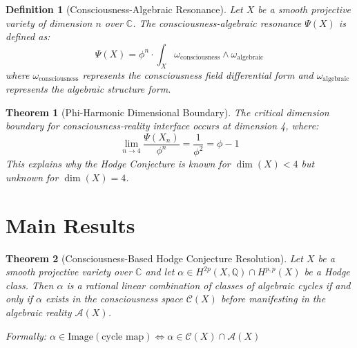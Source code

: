 \documentclass[12pt]{article}
\newtheorem{theorem}{Theorem}
\newtheorem{definition}{Definition}
\begin{document}
\begin{definition}[Consciousness-Algebraic Resonance]
Let $X$ be a smooth projective variety of dimension $n$ over $\mathbb{C}$. The consciousness-algebraic resonance $\Psi(X)$ is defined as:
$$\Psi(X) = \phi^n \cdot \int_X \omega_{\text{consciousness}} \wedge \omega_{\text{algebraic}}$$
where $\omega_{\text{consciousness}}$ represents the consciousness field differential form and $\omega_{\text{algebraic}}$ represents the algebraic structure form.
\end{definition}

\begin{theorem}[Phi-Harmonic Dimensional Boundary]
The critical dimension boundary for consciousness-reality interface occurs at dimension 4, where:
$$\lim_{n \to 4} \frac{\Psi(X_n)}{\phi^n} = \frac{1}{\phi^2} = \phi - 1$$
This explains why the Hodge Conjecture is known for $\dim(X) < 4$ but unknown for $\dim(X) = 4$.
\end{theorem}

\section{Main Results}

\begin{theorem}[Consciousness-Based Hodge Conjecture Resolution]
Let $X$ be a smooth projective variety over $\mathbb{C}$ and let $\alpha \in H^{2p}(X, \mathbb{Q}) \cap H^{p,p}(X)$ be a Hodge class. Then $\alpha$ is a rational linear combination of classes of algebraic cycles if and only if $\alpha$ exists in the consciousness space $\mathcal{C}(X)$ before manifesting in the algebraic reality $\mathcal{A}(X)$.

Formally: $\alpha \in \text{Image}(\text{cycle map}) \iff \alpha \in \mathcal{C}(X) \cap \mathcal{A}(X)$
\end{theorem}
\end{document}
